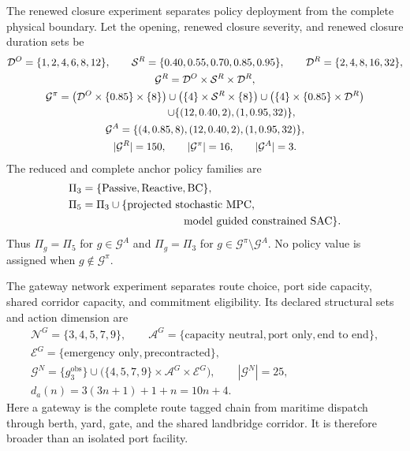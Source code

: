 \documentclass[a4paper,fleqn]{cas-sc}
\begin{document}
The renewed closure experiment separates policy deployment from the complete
physical boundary. Let the opening, renewed closure severity, and renewed
closure duration sets be
\begin{equation}
 \begin{gathered}
 \mathcal D^O=\{1,2,4,6,8,12\},\qquad
 \mathcal S^R=\{0.40,0.55,0.70,0.85,0.95\},\qquad
 \mathcal D^R=\{2,4,8,16,32\},\\
 \mathcal G^R=\mathcal D^O\times\mathcal S^R\times\mathcal D^R,\\
 \mathcal G^\pi=
 \big(\mathcal D^O\times\{0.85\}\times\{8\}\big)
 \cup\big(\{4\}\times\mathcal S^R\times\{8\}\big)
 \cup\big(\{4\}\times\{0.85\}\times\mathcal D^R\big)\\
 \hspace{18mm}\cup\{(12,0.40,2),(1,0.95,32)\},\\
 \mathcal G^A=\{(4,0.85,8),(12,0.40,2),(1,0.95,32)\},\\
 |\mathcal G^R|=150,\qquad |\mathcal G^\pi|=16,\qquad
 |\mathcal G^A|=3.
 \end{gathered}
 \label{eq:reclosure-coverage-51}
\end{equation}
The reduced and complete anchor policy families are
\begin{equation}
 \begin{aligned}
 \Pi_3={}&\{\text{Passive},\text{Reactive},\text{BC}\},\\
 \Pi_5={}&\Pi_3\cup\{\text{projected stochastic MPC},\\
          &\hspace{28mm}\text{model guided constrained SAC}\}.
 \end{aligned}
\end{equation}
Thus $\Pi_g=\Pi_5$ for $g\in\mathcal G^A$ and $\Pi_g=\Pi_3$ for
$g\in\mathcal G^\pi\setminus\mathcal G^A$. No policy value is assigned when
$g\notin\mathcal G^\pi$.

The gateway network experiment separates route choice, port side capacity,
shared corridor capacity, and commitment eligibility. Its declared structural
sets and action dimension are
\begin{equation}
 \begin{gathered}
 \mathcal N^G=\{3,4,5,7,9\},\qquad
 \mathcal A^G=\{\text{capacity neutral},\text{port only},
 \text{end to end}\},\\
 \mathcal E^G=\{\text{emergency only},\text{precontracted}\},\\
 \mathcal G^N=\{g_3^{\mathrm{obs}}\}\cup
 \big(\{4,5,7,9\}\times\mathcal A^G\times\mathcal E^G\big),
 \qquad |\mathcal G^N|=25,\\
 d_a(n)=3(3n+1)+1+n=10n+4.
 \end{gathered}
 \label{eq:gateway-network-design-51}
\end{equation}
Here a gateway is the complete route tagged chain from maritime dispatch
through berth, yard, gate, and the shared landbridge corridor. It is therefore
broader than an isolated port facility.
\end{document}
